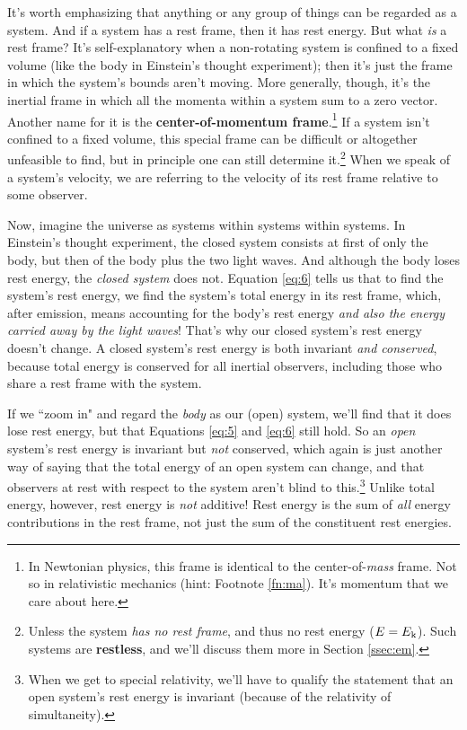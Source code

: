 \documentclass[12pt]{article}
\begin{document}
It's worth emphasizing that anything or any group of things can be regarded as a system. And if a system has a rest frame, then it has rest energy. But what \emph{is} a rest frame? It's self-explanatory when a non-rotating system is confined to a fixed volume (like the body in Einstein's thought experiment); then it's just the frame in which the system's bounds aren't moving. More generally, though, it's the inertial frame in which all the momenta within a system sum to a zero vector. Another name for it is the \textbf{center-of-momentum frame}.\footnote{In Newtonian physics, this frame is identical to the center-of-\emph{mass} frame. Not so in relativistic mechanics (hint: Footnote \ref{fn:ma}). It's momentum that we care about here.} If a system isn't confined to a fixed volume, this special frame can be difficult or altogether unfeasible to find, but in principle one can still determine it.\footnote{\label{fn:rl}Unless the system \emph{has no rest frame}, and thus no rest energy ($E = E_{\mkern.5mu \textrm{k}}$). Such systems are \textbf{restless}, and we'll discuss them more in Section \ref{ssec:em}.} When we speak of a system's velocity, we are referring to the velocity of its rest frame relative to some observer.

Now, imagine the universe as systems within systems within systems. In Einstein's thought experiment, the closed system consists at first of only the body, but then of the body plus the two light waves. And although the body loses rest energy, the \emph{closed system} does not. Equation \ref{eq:6} tells us that to find the system's rest energy, we find the system's total energy in its rest frame, which, after emission, means accounting for the body's rest energy \emph{and also the energy carried away by the light waves}! That's why our closed system's rest energy doesn't change. A closed system's rest energy is both invariant \emph{and conserved}, because total energy is conserved for all inertial observers, including those who share a rest frame with the system.

If we ``zoom in" and regard the \emph{body} as our (open) system, we'll find that it does lose rest energy, but that Equations \ref{eq:5} and \ref{eq:6} still hold. So an \emph{open} system's rest energy is invariant but \emph{not} conserved, which again is just another way of saying that the total energy of an open system can change, and that observers at rest with respect to the system aren't blind to this.\footnote{When we get to special relativity, we'll have to qualify the statement that an open system's rest energy is invariant (because of the relativity of simultaneity).} Unlike total energy, however, rest energy is \emph{not} additive! Rest energy is the sum of \emph{all} energy contributions in the rest frame, not just the sum of the constituent rest energies.
\end{document}
